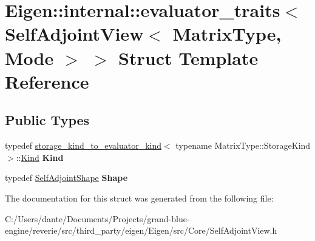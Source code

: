 \hypertarget{struct_eigen_1_1internal_1_1evaluator__traits_3_01_self_adjoint_view_3_01_matrix_type_00_01_mode_01_4_01_4}{}\section{Eigen\+::internal\+::evaluator\+\_\+traits$<$ Self\+Adjoint\+View$<$ Matrix\+Type, Mode $>$ $>$ Struct Template Reference}
\label{struct_eigen_1_1internal_1_1evaluator__traits_3_01_self_adjoint_view_3_01_matrix_type_00_01_mode_01_4_01_4}
\subsection*{Public Types}
\begin{DoxyCompactItemize}
\item 
\mbox{\label{struct_eigen_1_1internal_1_1evaluator__traits_3_01_self_adjoint_view_3_01_matrix_type_00_01_mode_01_4_01_4_a43e3797fae6cc08094826b7070f06c40}} 
typedef \mbox{\hyperlink{struct_eigen_1_1internal_1_1storage__kind__to__evaluator__kind}{storage\+\_\+kind\+\_\+to\+\_\+evaluator\+\_\+kind}}$<$ typename Matrix\+Type\+::\+Storage\+Kind $>$\+::\mbox{\hyperlink{struct_eigen_1_1internal_1_1_index_based}{Kind}} {\bfseries Kind}
\item 
\mbox{\label{struct_eigen_1_1internal_1_1evaluator__traits_3_01_self_adjoint_view_3_01_matrix_type_00_01_mode_01_4_01_4_ae7a1d5988e5a531663b25ff70e26376e}} 
typedef \mbox{\hyperlink{struct_eigen_1_1_self_adjoint_shape}{Self\+Adjoint\+Shape}} {\bfseries Shape}
\end{DoxyCompactItemize}


The documentation for this struct was generated from the following file\+:\begin{DoxyCompactItemize}
\item 
C\+:/\+Users/dante/\+Documents/\+Projects/grand-\/blue-\/engine/reverie/src/third\+\_\+party/eigen/\+Eigen/src/\+Core/Self\+Adjoint\+View.\+h\end{DoxyCompactItemize}
